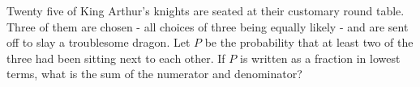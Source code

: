 Twenty five of King Arthur's knights are seated at their customary round table.  Three of them are chosen - all choices of three being equally likely - and are sent off to slay a troublesome dragon.  Let $P$ be the probability that at least two of the three had been sitting next to each other.  If $P$ is written as a fraction in lowest terms, what is the sum of the numerator and denominator?